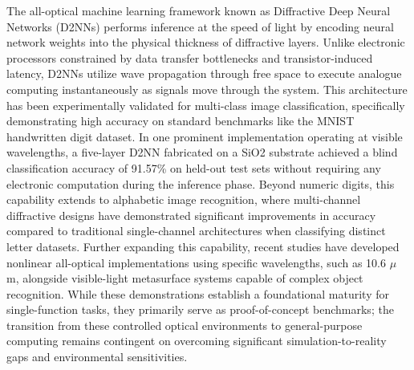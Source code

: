 The all-optical machine learning framework known as Diffractive Deep Neural Networks (D2NNs) performs inference at the speed of light by encoding neural network weights into the physical thickness of diffractive layers. \citep{doi_10_1021_acsphotonics_4c01284_s001_10346917} Unlike electronic processors constrained by data transfer bottlenecks and transistor-induced latency, D2NNs utilize wave propagation through free space to execute analogue computing instantaneously as signals move through the system. This architecture has been experimentally validated for multi-class image classification, specifically demonstrating high accuracy on standard benchmarks like the MNIST handwritten digit dataset. In one prominent implementation operating at visible wavelengths, a five-layer D2NN fabricated on a SiO2 substrate achieved a blind classification accuracy of 91.57\% on held-out test sets without requiring any electronic computation during the inference phase. Beyond numeric digits, this capability extends to alphabetic image recognition, where multi-channel diffractive designs have demonstrated significant improvements in accuracy compared to traditional single-channel architectures when classifying distinct letter datasets. Further expanding this capability, recent studies have developed nonlinear all-optical implementations using specific wavelengths, such as 10.6 \(\mu\) m, alongside visible-light metasurface systems capable of complex object recognition. While these demonstrations establish a foundational maturity for single-function tasks, they primarily serve as proof-of-concept benchmarks; the transition from these controlled optical environments to general-purpose computing remains contingent on overcoming significant simulation-to-reality gaps and environmental sensitivities. \citep{doi_10_54097_hset_v24i_3957_e6f20e8a} \citep{doi_10_1016_j_eng_2020_07_032_6e23cd05} \citep{doi_10_1155_2021_6667495_60f04b14} \citep{doi_10_1109_piers53385_2021_9694760_15b5fd61}

